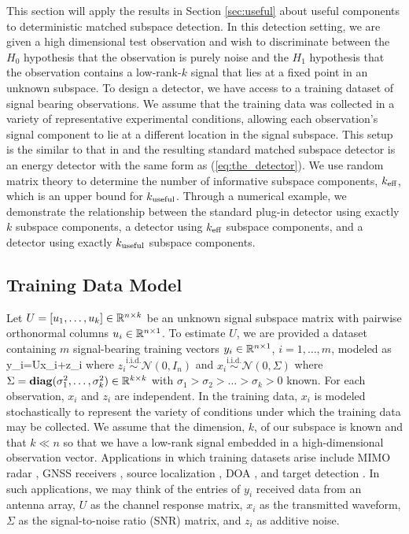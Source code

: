 This section will apply the results in Section \ref{sec:useful} about useful components to
deterministic matched subspace detection. In this detection setting, we are given a high
dimensional test observation and wish to discriminate between the $H_0$ hypothesis that
the observation is purely noise and the $H_1$ hypothesis that the observation contains a
low-rank-$k$ signal that lies at a fixed point in an unknown subspace. To design a
detector, we have access to a training dataset of signal bearing observations.
We assume that the training data was collected in a variety of representative experimental
conditions, allowing each observation's signal component to lie at a different location in
the signal subspace. This setup is the similar to that in \cite{asendorf2013performance}
and the resulting standard matched subspace detector is an energy detector with the same
form as (\ref{eq:the_detector}). We use random matrix theory to determine the number of
informative subspace components, $k_\text{eff}$, which is an upper bound for
$k_{\text{useful}}$. Through a numerical example, we demonstrate the relationship between the standard
plug-in detector using exactly $k$ subspace components, a detector using $k_\text{eff}$ subspace
components, and a detector using exactly $k_{\text{useful}}$ subspace components.

\subsection{Training Data Model}\label{sec:training_data}

Let $U=[u_1,\dots,u_k]\in\mathbb{R}^{n\times k}$ be an unknown signal subspace matrix with
pairwise orthonormal columns $u_i\in\mathbb{R}^{n\times 1}$. To estimate $U$, 
we are provided a dataset containing $m$ signal-bearing training vectors
$y_i\in\mathbb{R}^{n\times 1}$, $i=1,\dots,m$, modeled as 
\beq\label{eq:taes_train}
y_i=Ux_i+z_i 
\eeq 
where
$z_i\overset{\text{i.i.d.}}{\sim}\mathcal{N}(0,I_n)$ and
$x_i\overset{\text{i.i.d.}}{\sim}\mathcal{N}(0,\Sigma)$ where
$\Sigma=\mathop{\bf diag}(\sigma_1^2,\dots,\sigma_k^2)\in\mathbb{R}^{k\times k}$ with
$\sigma_1>\sigma_2>\dots>\sigma_k>0$ known. For each observation, $x_i$ and $z_i$ are
independent. In the training data, $x_i$ is modeled stochastically to represent the
variety of conditions under which the training data may be collected.  We assume that the
dimension, $k$, of our subspace is known and that $k\ll n$ so that we have a low-rank
signal embedded in a high-dimensional observation vector. Applications in which training
datasets arise include MIMO radar \cite{chen2013adaptive}, GNSS receivers
\cite{arribas2013antenna}, source localization \cite{he2013near}, DOA
\cite{liao2013direction}, and target detection \cite{kwon2013multi}. In such applications,
we may think of the entries of $y_i$ received data from an antenna array, $U$ as the
channel response matrix, $x_i$ as the transmitted waveform, $\Sigma$ as the signal-to-noise
ratio (SNR) matrix, and $z_i$ as additive noise.

